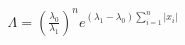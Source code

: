 \documentclass[preview]{standalone}
\begin{document}
\begin{align*}
\Lambda = \left(\frac{\lambda_0}{\lambda_1}\right)^n e^{(\lambda_1-\lambda_0)\sum_{i=1}^n|x_i|}
\end{align*}
\end{document}
